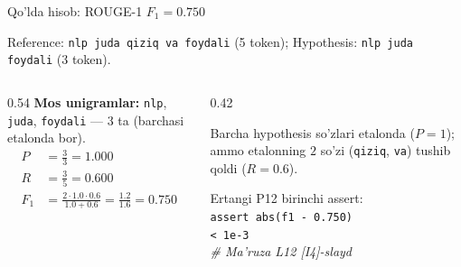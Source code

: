 \documentclass[aspectratio=169,11pt]{beamer}
\begin{document}
%
\begin{frame}{Qo'lda hisob: ROUGE-1 $F_1=0.750$}
  \begin{tcolorbox}[defbox,title={Reference va hypothesis}]
    \small
    Reference: \texttt{nlp juda qiziq va foydali} (5 token);
    Hypothesis: \texttt{nlp juda foydali} (3 token).
  \end{tcolorbox}
  \vspace{0.2em}
  \begin{columns}[T]
    \begin{column}{0.54\textwidth}
      \textbf{Mos unigramlar:} \texttt{nlp}, \texttt{juda}, \texttt{foydali}
      --- 3 ta (barchasi etalonda bor).
      \begin{align*}
        P &= \tfrac{3}{3} = \mathbf{1.000}\\
        R &= \tfrac{3}{5} = \mathbf{0.600}\\
        F_1 &= \tfrac{2\cdot 1.0\cdot 0.6}{1.0+0.6}
             = \tfrac{1.2}{1.6} = \mathbf{0.750}
      \end{align*}
    \end{column}
    \begin{column}{0.42\textwidth}
      \begin{tcolorbox}[okbox,top=2pt,bottom=2pt]
        \footnotesize
        Barcha hypothesis so'zlari etalonda ($P=1$); ammo etalonning $2$ so'zi
        (\texttt{qiziq}, \texttt{va}) tushib qoldi ($R=0.6$).
      \end{tcolorbox}
      \vspace{3pt}
      \footnotesize\color{halfgray}
      Ertangi P12 birinchi assert:\\
      \texttt{assert abs(f1 - 0.750)}\\
      \texttt{\phantom{xx}< 1e-3}\\
      \textit{\# Ma'ruza L12 [I4]-slayd}
    \end{column}
  \end{columns}
\end{frame}
\end{document}
